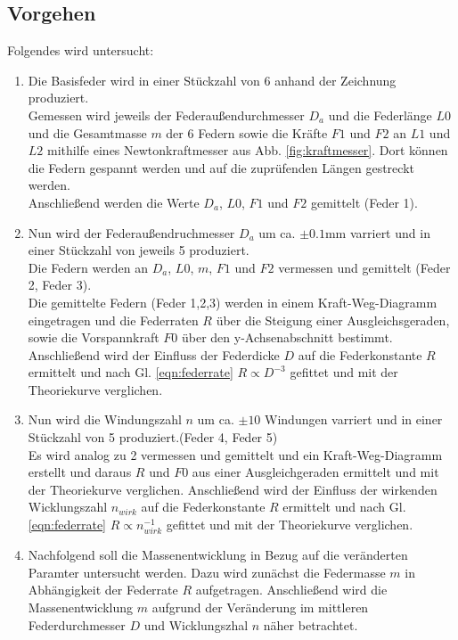 \subsection{Vorgehen}
Folgendes wird untersucht:
\begin{enumerate}
    \item   Die Basisfeder wird in einer Stückzahl von 6 anhand der Zeichnung produziert.\\
            Gemessen wird jeweils der Federaußendurchmesser $D_a$ und die Federlänge 
            $L0$ und die Gesamtmasse $m$ der 6 Federn sowie die Kräfte $F1$ und $F2$ an $L1$ und $L2$ mithilfe eines Newtonkraftmesser aus Abb. \ref{fig:kraftmesser}.
            Dort können die Federn gespannt werden und auf die zuprüfenden Längen gestreckt werden.\\
            Anschließend werden die Werte $D_a$, $L0$, $F1$ und $F2$ gemittelt (Feder 1).

    \item   Nun wird der Federaußendruchmesser $D_a$ um ca. $\pm0.1$mm varriert und in einer 
            Stückzahl von jeweils 5 produziert.\\
            Die Federn werden an $D_a$, $L0$, $m$, $F1$ und $F2$ vermessen und gemittelt (Feder 2, Feder 3).\\
            Die gemittelte Federn (Feder 1,2,3) werden in einem Kraft-Weg-Diagramm eingetragen und
            die Federraten $R$ über die Steigung einer Ausgleichsgeraden, sowie die Vorspannkraft $F0$ 
            über den y-Achsenabschnitt bestimmt.\\
            Anschließend wird der Einfluss der Federdicke $D$ auf die Federkonstante $R$ ermittelt
            und nach Gl. \ref{eqn:federrate} $R \propto D^{-3}$ gefittet und mit der Theoriekurve verglichen.

    \item   Nun wird die Windungszahl $n$ um ca. $\pm 10$ Windungen varriert und in einer Stückzahl von 5 produziert.(Feder 4, Feder 5)\\
            Es wird analog zu 2 vermessen und gemittelt und ein Kraft-Weg-Diagramm erstellt und
            daraus $R$ und $F0$ aus einer Ausgleichgeraden ermittelt und mit der Theoriekurve verglichen.
            Anschließend wird der Einfluss der wirkenden Wicklungszahl $n_{wirk}$ auf die Federkonstante $R$ ermittelt
            und nach Gl. \ref{eqn:federrate} $R \propto n_{wirk}^{-1}$ gefittet und mit der Theoriekurve verglichen.

    \item   Nachfolgend soll die Massenentwicklung in Bezug auf die veränderten Paramter untersucht werden.
    Dazu wird zunächst die Federmasse $m$ in  Abhängigkeit der Federrate $R$ aufgetragen. Anschließend
    wird die Massenentwicklung $m$ aufgrund der Veränderung im mittleren Federdurchmesser $D$ und Wicklungszhal $n$
    näher betrachtet.
\end{enumerate}
